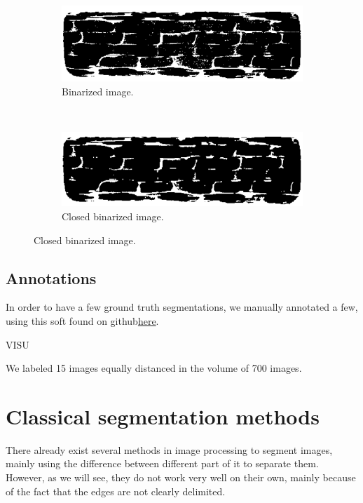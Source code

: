 \documentclass{report}
\begin{document}
\begin{figure}[!h]
\centering
	\begin{subfigure}[b]{0.4\linewidth}
		\centering
		\includegraphics[width=\linewidth]{figures/Thibault/fibres_binar.png}
		\caption{Binarized image.}
	\end{subfigure}
~
	\begin{subfigure}[b]{0.4\linewidth}
		\centering
		\includegraphics[width=\linewidth]{figures/Thibault/fibres_closed.png}
	\caption{Closed binarized image.}
\end{subfigure}
\label{fig:binar}
\end{figure}

\section{Annotations}

In order to have a few ground truth segmentations, we manually annotated a few, using this soft found on github\href{https://github.com/wkentaro/labelme}{here}.

VISU

We labeled 15 images equally distanced in the volume of 700 images.

\chapter{Classical segmentation methods}

There already exist several methods in image processing to segment images, mainly using the difference between different part of it to separate them.   
However, as we will see, they do not work very well on their own, mainly because of the fact that the edges are not clearly delimited.
\end{document}
